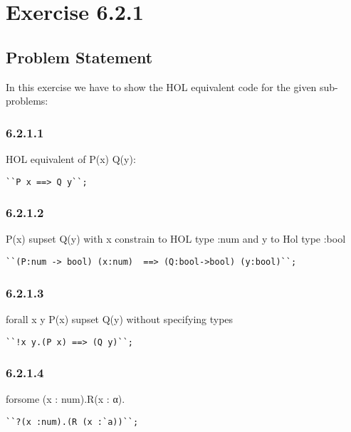 \documentclass{report}
\begin{document}
\chapter{Exercise 6.2.1}
\label{cha:exercise-6.2.1}

\section{Problem Statement}
\label{sec:problem-statement-5}

In this exercise we have to show the HOL equivalent code for the given sub-problems:

\subsection{6.2.1.1}
\label{sec:6.2.1.1}

 HOL equivalent of P(x)  Q(y):

\lstset{frameround=tttt}
\begin{lstlisting}[frame=tRBL]
``P x ==> Q y``;
\end{lstlisting}

\subsection{6.2.1.2}
\label{sec:6.2.1.2}
P(x) supset Q(y) with x constrain to HOL type :num and y to Hol type :bool 

\lstset{frameround=tttt}
\begin{lstlisting}[frame=tRBL]
``(P:num -> bool) (x:num)  ==> (Q:bool->bool) (y:bool)``;
\end{lstlisting}

\subsection{6.2.1.3}
\label{sec:6.2.1.3}
forall x y P(x) supset Q(y) without specifying types

\lstset{frameround=tttt}
\begin{lstlisting}[frame=tRBL]
``!x y.(P x) ==> (Q y)``;
\end{lstlisting}

\subsection{6.2.1.4}
\label{sec:6.2.1.4}
forsome (x : num).R(x : α).

\lstset{frameround=tttt}
\begin{lstlisting}[frame=tRBL]
``?(x :num).(R (x :`a))``;
\end{lstlisting}
\end{document}

